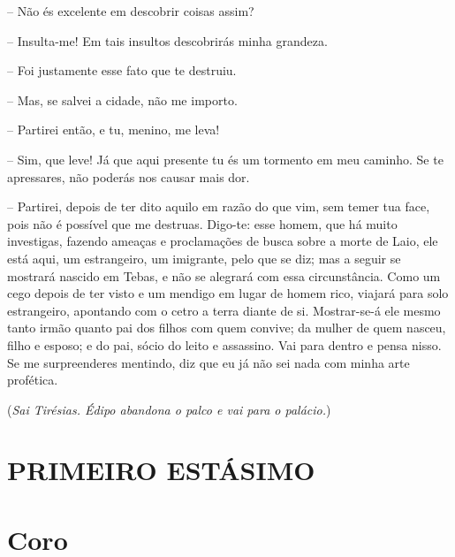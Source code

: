  --    Não és excelente em descobrir coisas assim?

 --   Insulta-me! Em tais insultos descobrirás minha grandeza.

 --   Foi justamente esse fato que te destruiu.

 --   Mas, se salvei a cidade, não me importo.

 --   Partirei então, e tu, menino, me leva!

 --   Sim, que leve! Já que aqui presente tu és um tormento em meu caminho. Se
te apressares, não poderás nos causar mais dor.

 --   Partirei, depois de ter dito aquilo em razão do que vim, sem temer tua
face, pois  não é possível que me destruas. Digo-te: esse homem,
que há muito investigas, fazendo ameaças e proclamações de busca sobre a
morte de Laio, ele está aqui, um estrangeiro, um imigrante, pelo que se
diz; mas a seguir se mostrará nascido em Tebas, e não se alegrará com
essa circunstância. Como um cego depois de ter visto e um mendigo em
lugar de homem rico, viajará para solo estrangeiro, apontando com o
cetro a terra diante de si. Mostrar-se-á ele mesmo tanto irmão quanto
pai dos filhos com quem  convive; da mulher de quem nasceu, filho e
esposo; e do pai, sócio do leito e assassino. Vai para dentro e pensa
nisso. Se me surpreenderes mentindo, diz que eu já não sei nada com
minha arte profética.

(\emph{Sai Tirésias. Édipo abandona o palco e vai para o palácio.})

\section{PRIMEIRO ESTÁSIMO}

\section{Coro} 


